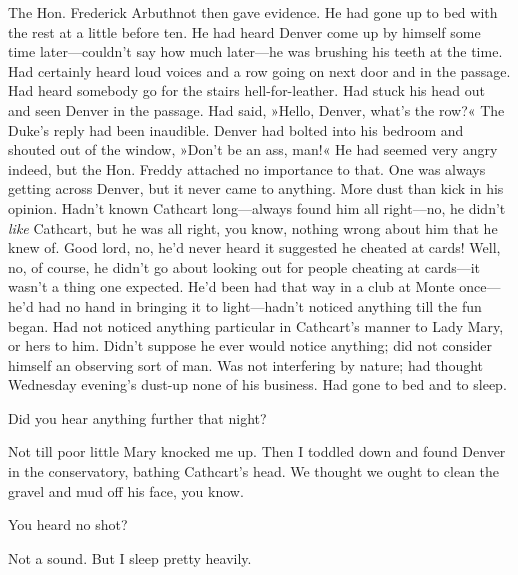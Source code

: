 The Hon. Frederick Arbuthnot then gave evidence. He had gone up to bed with the rest at a little before ten. He had heard Denver come up by himself some time later\allowbreak---\allowbreak couldn't say how much later\allowbreak---\allowbreak he was brushing his teeth at the time.  Had certainly heard loud voices and a row going on next door and in the passage. Had heard somebody go for the stairs hell-for-leather. Had stuck his head out and seen Denver in the passage. Had said, »Hello, Denver, what's the row?« The Duke's reply had been inaudible. Denver had bolted into his bedroom and shouted out of the window, »Don't be an ass, man!« He had seemed very angry indeed, but the Hon. Freddy attached no importance to that.  One was always getting across Denver, but it never came to anything.  More dust than kick in his opinion. Hadn't known Cathcart long\allowbreak---\allowbreak always found him all right\allowbreak---\allowbreak no, he didn't \textit{like} Cathcart, but he was all right, you know, nothing wrong about him that he knew of. Good lord, no, he'd never heard it suggested he cheated at cards! Well, no, of course, he didn't go about looking out for people cheating at cards\allowbreak---\allowbreak it wasn't a thing one expected. He'd been had that way in a club at Monte once\allowbreak---\allowbreak he'd had no hand in bringing it to light\allowbreak---\allowbreak hadn't noticed anything till the fun began. Had not noticed anything particular in Cathcart's manner to Lady Mary, or hers to him. Didn't suppose he ever would notice anything; did not consider himself an observing sort of man. Was not interfering by nature; had thought Wednesday evening's dust-up none of his business. Had gone to bed and to sleep.

\begin{dialogue}

 Did you hear anything further that night?

 Not till poor little Mary knocked me up. Then I toddled down and found Denver in the conservatory, bathing Cathcart's head. We thought we ought to clean the gravel and mud off his face, you know.

 You heard no shot?

 Not a sound. But I sleep pretty heavily.
\end{dialogue}

